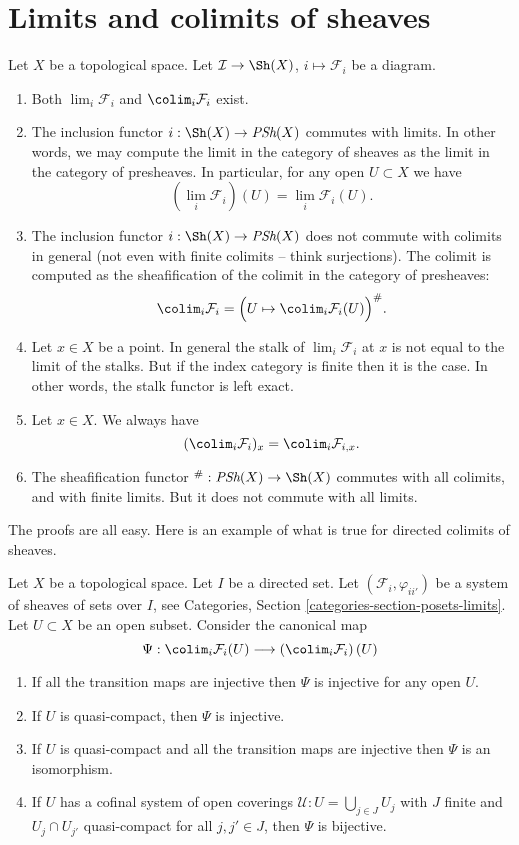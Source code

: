 \section{Limits and colimits of sheaves}
\label{section-limits-sheaves}

\noindent
Let $X$ be a topological space.
Let $\mathcal{I} \to \Sh(X)$, $i \mapsto \mathcal{F}_i$
be a diagram.
\begin{enumerate}
\item Both $\lim_i \mathcal{F}_i$ and $\colim_i \mathcal{F}_i$
exist.
\item The inclusion functor $i : \Sh(X) \to \textit{PSh}(X)$
commutes with limits. In other words, we may compute the limit
in the category of sheaves as the limit in the category of
presheaves. In particular, for any open $U \subset X$ we have
$$
(\lim_i \mathcal{F}_i)(U) = \lim_i \mathcal{F}_i(U).
$$
\item The inclusion functor $i : \Sh(X) \to \textit{PSh}(X)$
does not commute with colimits in general (not even
with finite colimits -- think surjections). The colimit is
computed as the sheafification of the colimit in the
category of presheaves:
$$
\colim_i \mathcal{F}_i =
\Big(U \mapsto \colim_i \mathcal{F}_i(U)\Big)^\#.
$$
\item Let $x \in X$ be a point. In general the stalk of
$\lim_i \mathcal{F}_i$ at $x$ is not equal to
the limit of the stalks. But if the index category is finite
then it is the case. In other words, the stalk functor is
left exact.
\item Let $x \in X$. We always have
$$
(\colim_i \mathcal{F}_i)_x = \colim_i \mathcal{F}_{i, x}.
$$
\item The sheafification functor
${}^\# : \textit{PSh}(X) \to \Sh(X)$ commutes with all
colimits, and with finite limits. But it does not commute
with all limits.
\end{enumerate}
The proofs are all easy. Here is an example of what is true for directed
colimits of sheaves.

\begin{lemma}
\label{lemma-directed-colimits-sections}
Let $X$ be a topological space. Let $I$ be a directed set.
Let $(\mathcal{F}_i, \varphi_{ii'})$ be a system of sheaves of sets
over $I$, see
Categories, Section \ref{categories-section-posets-limits}.
Let $U \subset X$ be an open subset.
Consider the canonical map
$$
\Psi :
\colim_i \mathcal{F}_i(U)
\longrightarrow
\left(\colim_i \mathcal{F}_i\right)(U)
$$
\begin{enumerate}
\item If all the transition maps are injective then
$\Psi$ is injective for any open $U$.
\item If $U$ is quasi-compact, then $\Psi$ is injective.
\item If $U$ is quasi-compact and all the transition maps are injective
then $\Psi$ is an isomorphism.
\item If $U$ has a cofinal system of open coverings
$\mathcal{U} : U = \bigcup_{j\in J} U_j$ with
$J$ finite and $U_j \cap U_{j'}$ quasi-compact
for all $j, j' \in J$, then $\Psi$ is bijective.
\end{enumerate}
\end{lemma}

